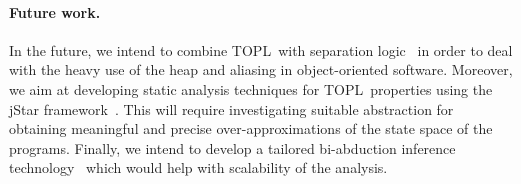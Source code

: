 \documentclass{sigplanconf}[10pt] %
\newcommand{\TPL}{TOPL}
\newcommand{\noterg}[2]{\textcolor{gray}{[\textcolor{red}{#1}: #2]}}
\newcommand{\dd}[1]{\noterg{dd}{#1}}
\newcommand{\dinocomment}[1]{\dd{#1}}
\begin{document}
\paragraph{Future work.}
In the future, we intend to combine \TPL \ with  separation logic~\cite{reynolds2002} in order to deal with the heavy use of the heap and aliasing in object-oriented software. Moreover, we aim at developing static analysis techniques for \TPL \ properties using the jStar framework~\cite{DBLP:conf/oopsla/DistefanoP08}.
This will require investigating suitable abstraction for obtaining meaningful and precise over-approximations of the state space of the programs.
Finally, we intend to develop a tailored bi-abduction inference technology~\cite{dblp:conf/popl/CalcagnoDOY09} which would help with scalability of the analysis.
\end{document}
